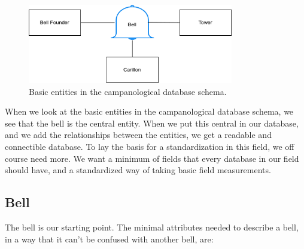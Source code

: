 \documentclass[11pt, a4paper]{article}
\begin{document}
\begin{figure}[h!]
    \centering
    \includegraphics[width=0.8\textwidth]{images/basic_entities.png}
    \caption{Basic entities in the campanological database schema.}
    \label{fig:basic-entities}
\end{figure}

When we look at the basic entities in the campanological database schema, we see that the bell is the central entity.
When we put this central in our database, and we add the relationships between the entities, we get a readable and 
connectible database. To lay the basis for a standardization in this field, we off course need more. We want a minimum
of fields that every database in our field should have, and a standardized way of taking basic field measurements.

\subsection{Bell}

The bell is our starting point. The minimal attributes needed to describe a bell, in a way that it can't be confused with another bell, are:
\end{document}
